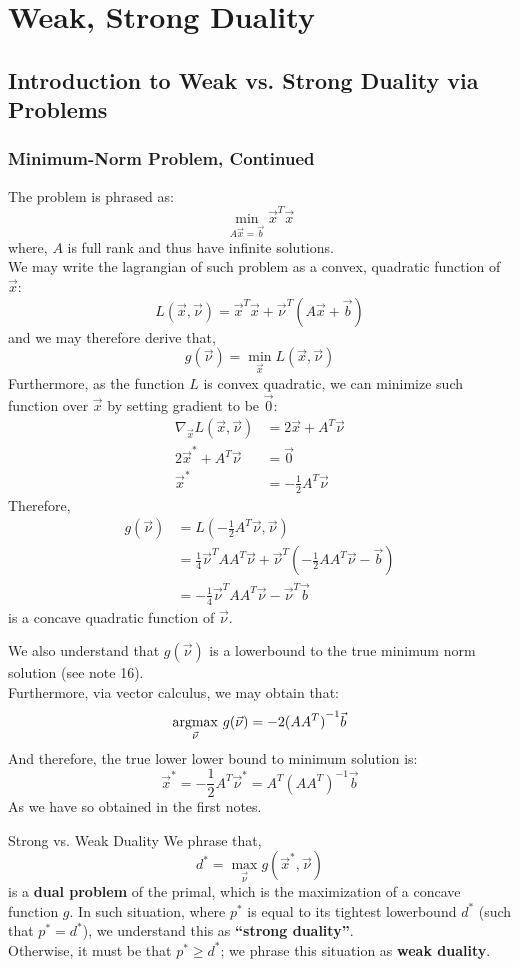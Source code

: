 \chapter{Weak, Strong Duality}

\section{Introduction to Weak vs. Strong Duality via Problems}
\subsection{Minimum-Norm Problem, Continued}
The problem is phrased as:
\[
    \min_{A \vec{x} = \vec{b}} \vec{x}^T \vec{x}
\]
where, $A$ is full rank and thus have infinite solutions. \\
We may write the lagrangian of such problem as a convex, quadratic function of $\vec{x}$:
\[
    L(\vec{x}, \vec{\nu}) = \vec{x}^T \vec{x} + {\vec{\nu}}^T (A\vec{x} + \vec{b})
\]
and we may therefore derive that,
\[
    g(\vec{\nu}) = \min_{\vec{x}} L(\vec{x}, \vec{\nu})
\]
Furthermore, as the function $L$ is convex quadratic, we can minimize such function over $\vec{x}$ by setting gradient to be $\vec{0}$:
\begin{align*}
    \nabla_{\vec{x}} L(\vec{x}, \vec{\nu})
    &= 2 \vec{x} + A^T \vec{\nu} \\
    2 \vec{x}^* + A^T \vec{\nu} &= \vec{0} \\
    \vec{x}^* &= -\frac{1}{2} A^T \vec{\nu}
\end{align*}
Therefore,
\begin{align*}
    g(\vec{\nu}) &= L(-\frac{1}{2} A^T \vec{\nu}, \vec{\nu}) \\
    &= \frac{1}{4} \vec{\nu}^T A A^T \vec{\nu} + \vec{\nu}^T (-\frac{1}{2} A A^T \vec{\nu} - \vec{b}) \\
    &= - \frac{1}{4} \vec{\nu}^T A A^T \vec{\nu} - \vec{\nu}^T \vec{b}
\end{align*}
is a concave quadratic function of $\vec{\nu}$.

We also understand that $g(\vec{\nu})$ is a lowerbound to the true minimum norm solution (see note 16). \\
Furthermore, via vector calculus, we may obtain that:
\[
    \underset{\vec{\nu}}{\rm argmax}\ g(\vec{\nu}) = -2 {(A A^T)}^{-1} \vec{b}
\]
And therefore, the true lower lower bound to minimum solution is:
\[
    \vec{x}^* = -\frac{1}{2} A^T \vec{\nu}^* = A^T {(A A^T)}^{-1} \vec{b}
\]
As we have so obtained in the first notes. \\
\begin{ln-define}{Strong vs. Weak Duality}{}
    We phrase that,
    \[
        d^* = \max_{\vec{\nu}} g(\vec{x}^*, \vec{\nu})
    \]
    is a \textbf{dual problem} of the primal, which is the maximization of a concave function $g$.
    In such situation, where $p^*$ is equal to its tightest lowerbound $d^*$ (such that $p^* = d^*$), we understand this as \textbf{``strong duality''}. \\
    Otherwise, it must be that $p^* \geq d^*$; we phrase this situation as \textbf{weak duality}.
\end{ln-define}

